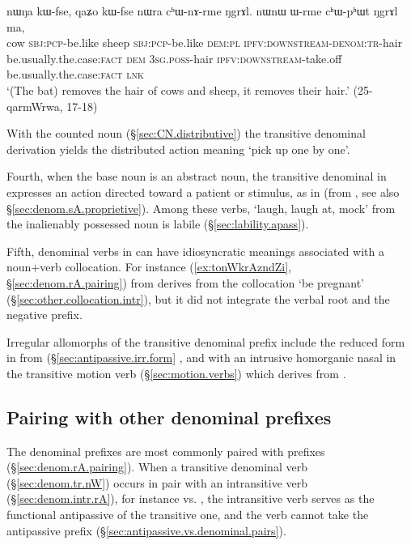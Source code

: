 \begin{exe}
\ex \label{ex:chWnArme}
\gll  nɯŋa kɯ-fse, qaʑo kɯ-fse nɯra cʰɯ-nɤ-rme ŋgrɤl. nɯnɯ ɯ-rme cʰɯ-pʰɯt ŋgrɤl ma, \\
cow \textsc{sbj}:\textsc{pcp}-be.like sheep \textsc{sbj}:\textsc{pcp}-be.like \textsc{dem}:\textsc{pl} \textsc{ipfv}:\textsc{downstream}-\textsc{denom}:\textsc{tr}-hair be.usually.the.case:\textsc{fact} \textsc{dem} \textsc{3sg}.\textsc{poss}-hair \textsc{ipfv}:\textsc{downstream}-take.off  be.usually.the.case:\textsc{fact} \textsc{lnk} \\
\glt `(The bat) removes the hair of cows and sheep, it removes their hair.' (25-qarmWrwa, 17-18)
\end{exe}

With the counted noun  (§\ref{sec:CN.distributive}) the transitive denominal derivation  yields the distributed action meaning  `pick up one by one'.

Fourth, when the base noun is an abstract noun, the transitive denominal in  expresses an action directed toward a patient or stimulus, as in  (from 
, see also §\ref{sec:denom.sA.proprietive}). Among these verbs,  `laugh, laugh at, mock' from the inalienably possessed noun  is labile (§\ref{sec:lability.apass}).


  
Fifth, denominal verbs in  can have idiosyncratic meanings associated with a noun+verb collocation. For instance  (\ref{ex:tonWkrAzndZi}, §\ref{sec:denom.rA.pairing}) from   derives from the collocation  `be pregnant' (§\ref{sec:other.collocation.intr}), but it did not integrate the verbal root  and the negative prefix.

Irregular allomorphs of the transitive denominal  prefix include the reduced form  in  from  (§\ref{sec:antipassive.irr.form} , and  with an intrusive homorganic nasal in the transitive motion verb  (§\ref{sec:motion.verbs}) which derives from .

\subsection{Pairing with other denominal prefixes}  \label{sec:denom.nW.pairing}
The   denominal prefixes are most commonly paired with  prefixes (§\ref{sec:denom.rA.pairing}). When a transitive  denominal verb (§\ref{sec:denom.tr.nW}) occurs in pair with an intransitive   verb (§\ref{sec:denom.intr.rA}), for instance   vs. , the intransitive verb serves as the functional antipassive of the transitive one, and the  verb cannot take the antipassive  prefix (§\ref{sec:antipassive.vs.denominal.pairs}).

